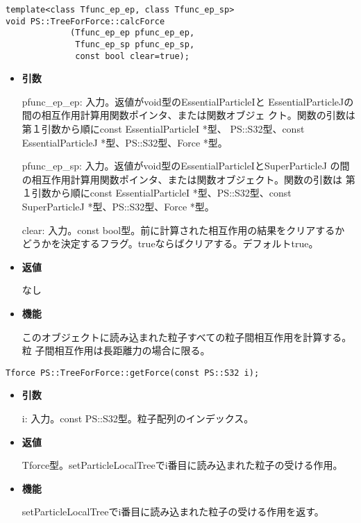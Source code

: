\begin{screen}
\begin{verbatim}
template<class Tfunc_ep_ep, class Tfunc_ep_sp>
void PS::TreeForForce::calcForce
             (Tfunc_ep_ep pfunc_ep_ep,
              Tfunc_ep_sp pfunc_ep_sp,
              const bool clear=true);
\end{verbatim}
\end{screen}

\begin{itemize}

\item {\bf 引数}

pfunc\_ep\_ep: 入力。返値がvoid型のEssentialParticleIと
EssentialParticleJの間の相互作用計算用関数ポインタ、または関数オブジェ
クト。関数の引数は第１引数から順にconst EssentialParticleI *型、
PS::S32型、const EssentialParticleJ *型、PS::S32型、Force *型。

pfunc\_ep\_sp: 入力。返値がvoid型のEssentialParticleIとSuperParticleJ
の間の相互作用計算用関数ポインタ、または関数オブジェクト。関数の引数は
第１引数から順にconst EssentialParticleI *型、PS::S32型、const
SuperParticleJ *型、PS::S32型、Force *型。

clear: 入力。const bool型。前に計算された相互作用の結果をクリアするか
どうかを決定するフラグ。trueならばクリアする。デフォルトtrue。

\item {\bf 返値}

なし

\item {\bf 機能}

このオブジェクトに読み込まれた粒子すべての粒子間相互作用を計算する。粒
子間相互作用は長距離力の場合に限る。

\end{itemize}


\begin{screen}
\begin{verbatim}
Tforce PS::TreeForForce::getForce(const PS::S32 i);
\end{verbatim}
\end{screen}

\begin{itemize}

\item {\bf 引数}

i: 入力。const PS::S32型。粒子配列のインデックス。

\item {\bf 返値}

Tforce型。setParticleLocalTreeでi番目に読み込まれた粒子の受ける作用。

\item {\bf 機能}

setParticleLocalTreeでi番目に読み込まれた粒子の受ける作用を返す。

\end{itemize}

